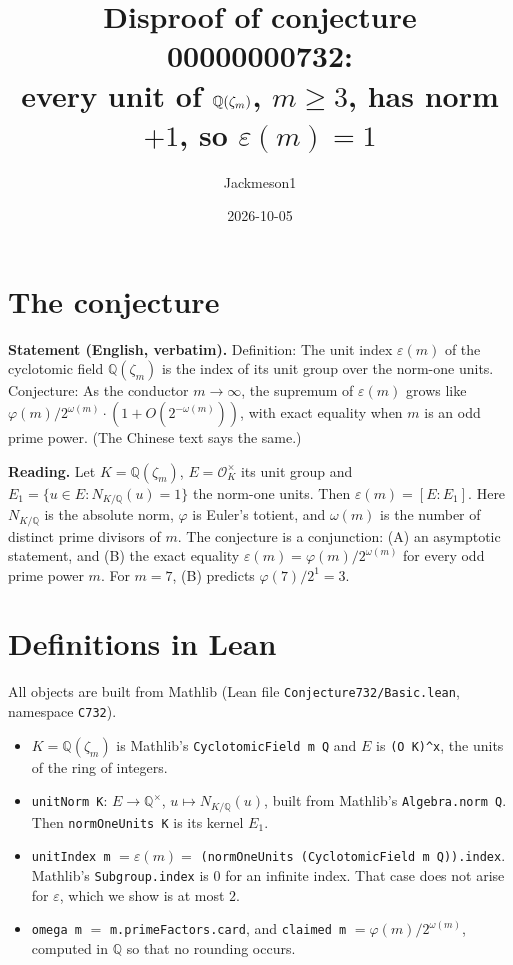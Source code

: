 \documentclass[11pt]{article}
\title{Disproof of conjecture 00000000732:\\ every unit of $\Q(\zeta_m)$, $m\ge 3$, has norm $+1$, so $\varepsilon(m)=1$}
\author{Jackmeson1}
\date{2026-10-05}
\theoremstyle{definition}
\newcommand{\Q}{\mathbb{Q}}
\newcommand{\OK}{\mathcal{O}_K}
\begin{document}
\maketitle

\section{The conjecture}

\textbf{Statement (English, verbatim).} Definition: The unit index $\varepsilon(m)$ of the
cyclotomic field $\Q(\zeta_m)$ is the index of its unit group over the norm-one units.
Conjecture: As the conductor $m\to\infty$, the supremum of $\varepsilon(m)$ grows like
$\varphi(m)/2^{\omega(m)}\cdot(1+O(2^{-\omega(m)}))$, with exact equality when $m$ is an odd
prime power. (The Chinese text says the same.)

\textbf{Reading.} Let $K=\Q(\zeta_m)$, $E=\OK^\times$ its unit group and
$E_1=\{u\in E : N_{K/\Q}(u)=1\}$ the norm-one units. Then $\varepsilon(m)=[E:E_1]$. Here
$N_{K/\Q}$ is the absolute norm, $\varphi$ is Euler's totient, and $\omega(m)$ is the number of
distinct prime divisors of $m$. The conjecture is a conjunction: (A) an asymptotic statement, and
(B) the exact equality $\varepsilon(m)=\varphi(m)/2^{\omega(m)}$ for every odd prime power $m$.
For $m=7$, (B) predicts $\varphi(7)/2^{1}=3$.

\section{Definitions in Lean}

All objects are built from Mathlib (Lean file \texttt{Conjecture732/Basic.lean}, namespace
\texttt{C732}).
\begin{itemize}
\item $K=\Q(\zeta_m)$ is Mathlib's \texttt{CyclotomicField m Q} and $E$ is \texttt{(O K)\^{}x}, the
units of the ring of integers.
\item \texttt{unitNorm K}: $E\to\Q^\times$, $u\mapsto N_{K/\Q}(u)$, built from Mathlib's
\texttt{Algebra.norm Q}. Then \texttt{normOneUnits K} is its kernel $E_1$.
\item \texttt{unitIndex m} $=\varepsilon(m)=$ \texttt{(normOneUnits (CyclotomicField m Q)).index}.
Mathlib's \texttt{Subgroup.index} is $0$ for an infinite index. That case does not arise for
$\varepsilon$, which we show is at most $2$.
\item \texttt{omega m} $=$ \texttt{m.primeFactors.card}, and
\texttt{claimed m} $=\varphi(m)/2^{\omega(m)}$, computed in $\Q$ so that no rounding occurs.
\end{itemize}
\end{document}
